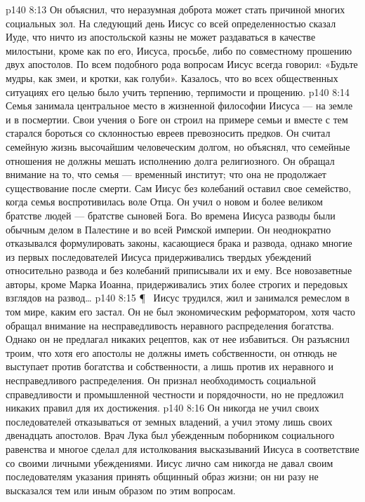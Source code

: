 \vs p140 8:13 Он объяснил, что неразумная доброта может стать причиной многих социальных зол. На следующий день Иисус со всей определенностью сказал Иуде, что ничто из апостольской казны не может раздаваться в качестве милостыни, кроме как по его, Иисуса, просьбе, либо по совместному прошению двух апостолов. По всем подобного рода вопросам Иисус всегда говорил: «Будьте мудры, как змеи, и кротки, как голуби». Казалось, что во всех общественных ситуациях его целью было учить терпению, терпимости и прощению.
\vs p140 8:14 Семья занимала центральное место в жизненной философии Иисуса --- на земле и в посмертии. Свои учения о Боге он строил на примере семьи и вместе с тем старался бороться со склонностью евреев превозносить предков. Он считал семейную жизнь высочайшим человеческим долгом, но объяснял, что семейные отношения не должны мешать исполнению долга религиозного. Он обращал внимание на то, что семья --- временный институт; что она не продолжает существование после смерти. Сам Иисус без колебаний оставил свое семейство, когда семья воспротивилась воле Отца. Он учил о новом и более великом братстве людей --- братстве сыновей Бога. Во времена Иисуса разводы были обычным делом в Палестине и во всей Римской империи. Он неоднократно отказывался формулировать законы, касающиеся брака и развода, однако многие из первых последователей Иисуса придерживались твердых убеждений относительно развода и без колебаний приписывали их и ему. Все новозаветные авторы, кроме Марка Иоанна, придерживались этих более строгих и передовых взглядов на развод\ldots
\vs p140 8:15 \P\ \bibnobreakspace {} Иисус трудился, жил и занимался ремеслом в том мире, каким его застал. Он не был экономическим реформатором, хотя часто обращал внимание на несправедливость неравного распределения богатства. Однако он не предлагал никаких рецептов, как от нее избавиться. Он разъяснил троим, что хотя его апостолы не должны иметь собственности, он отнюдь не выступает против богатства и собственности, а лишь против их неравного и несправедливого распределения. Он признал необходимость социальной справедливости и промышленной честности и порядочности, но не предложил никаких правил для их достижения.
\vs p140 8:16 Он никогда не учил своих последователей отказываться от земных владений, а учил этому лишь своих двенадцать апостолов. Врач Лука был убежденным поборником социального равенства и многое сделал для истолкования высказываний Иисуса в соответствие со своими личными убеждениями. Иисус лично сам никогда не давал своим последователям указания принять общинный образ жизни; он ни разу не высказался тем или иным образом по этим вопросам.
